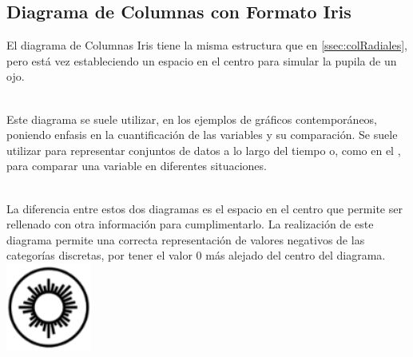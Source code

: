 \documentclass{article}\usepackage[]{graphicx}\usepackage[]{color}
\begin{document}
\subsection{Diagrama de Columnas con Formato Iris}\label{ssec:colRadialesIris}
El diagrama de Columnas Iris tiene la misma estructura que en \ref{ssec:colRadiales}, pero est\'a vez estableciendo un espacio en el centro para simular la pupila de un ojo.~\\~\par
Este diagrama se suele utilizar, en los ejemplos de gr\'aficos contempor\'aneos\cite{bar-example}, poniendo enfasis en la cuantificaci\'on de las variables y su comparaci\'on. Se suele utilizar para representar conjuntos de datos a lo largo del tiempo o, como en el , para comparar una variable en diferentes situaciones.~\\~\par
La diferencia entre estos dos diagramas es el espacio en el centro que permite ser rellenado con otra informaci\'on para cumplimentarlo. La realizaci\'on de este diagrama permite una correcta representaci\'on de valores negativos de las categor\'ias discretas, por tener el valor 0 m\'as alejado del centro del diagrama.
~\\
\vbox{
    \centering
    \includegraphics[width=0.21\textwidth]{imag/columnas_sep}
}
\end{document}

